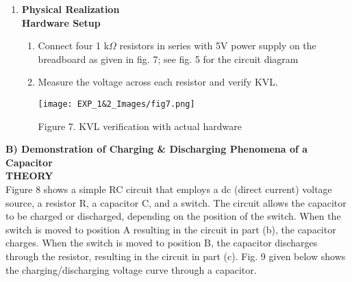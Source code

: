 \documentclass[12pt,a4paper]{article}
\begin{document}
\begin{justify}
\begin{enumerate}
Dragging and connecting the components: 4 Resistors, each 1k$\Omega$, Power supply- 5V, and 4 Multimeter- selected as voltage mode, the final circuit on TinkerCAD looks like as shown in fig. 6 below. After starting the simulation, we can see the result of voltage reading across each resistor and verify the KVL.


   \begin{center} 
    \texttt{[image: EXP\_1\&2\_Images/fig6.png]}
    \end{center}
    \vspace{-5mm}
    \begin{center} {Figure 6. KVL verification on TinkerCAD}\end{center}
\vspace{2cm}
\item \textbf{Physical Realization\\Hardware Setup}
    \begin{enumerate}
    \item Connect four 1 k$\Omega$ resistors in series with 5V power supply on the breadboard as given in fig. 7; see fig. 5 for the circuit diagram
    \item Measure the voltage across each resistor and verify KVL.
        
    \begin{center} 
    \texttt{[image: EXP\_1\&2\_Images/fig7.png]}
    \end{center}
    \vspace{-5mm}
    \begin{center} {Figure 7. KVL verification with actual hardware}\end{center}
    \end{enumerate}
    
\end{enumerate}


\noindent \textbf{\large {B) Demonstration of Charging \& Discharging Phenomena of a Capacitor} }\\[6pt]
\textbf{\large THEORY}\\[3pt]
Figure 8 shows a simple RC circuit that employs a dc (direct current) voltage source, a resistor R, a capacitor C, and a switch. The circuit allows the capacitor to be charged or discharged, depending on the position of the switch. When the switch is moved to position A resulting in the circuit in part (b), the capacitor charges. When the switch is moved to position B, the capacitor discharges through the resistor, resulting in the circuit in part (c). Fig. 9 given below shows the charging/discharging voltage curve through a capacitor. 


\end{justify}
\end{document}
